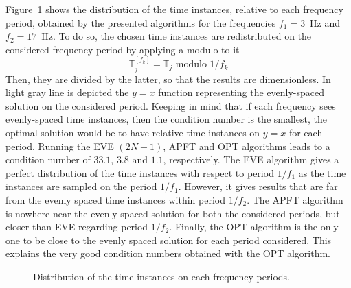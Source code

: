 Figure~\ref{fig:distribution_tlv} shows the distribution of the time
instances, relative to each frequency period, obtained by the presented
algorithms for the frequencies $f_1 = 3$~Hz and $f_2 = 17$~Hz. 
To do so, the chosen time instances are redistributed
on the considered frequency period by applying a modulo to it
\begin{equation}
  \label{eq:1}
  \mathbb{T}^{[f_k]}_j =  \mathbb{T}_j \text{ modulo } 1/f_k
\end{equation}
Then, they are divided by the latter, so that the results are
dimensionless.  In light gray line is depicted the $y=x$ function
representing the evenly-spaced solution on the considered period.
Keeping in mind that if each frequency sees evenly-spaced time instances,
then the condition number is the smallest, the optimal solution would
be to have relative time instances on $y=x$ for each period.  Running the
EVE $(2N + 1)$, APFT and OPT algorithms leads to a condition number of $33.1$,
$3.8$ and $1.1$, respectively.  The EVE algorithm gives a perfect distribution
of the time instances with respect to
period $1/f_1$ as the time instances are sampled on the period
$1/f_1$. However, it gives results that are far from the evenly spaced time instances
within period $1/f_2$. The APFT algorithm is nowhere near the evenly spaced
solution for both the considered periods, but closer than EVE regarding
period $1/f_2$. Finally, the OPT algorithm is the only one to be close
to the evenly spaced solution for each period considered. This explains the
very good condition numbers obtained with the OPT algorithm.
\begin{figure}[htp]
  \centering 
  \caption{Distribution of the time instances on each frequency periods.}
  \label{fig:distribution_tlv}
\end{figure}
